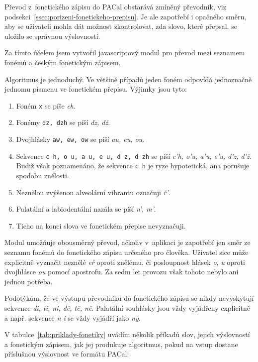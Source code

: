 Převod z~fonetického zápisu do PACal obstarává zmíněný převodník, viz
podsekci~\ref{ssec:porizeni-fonetickeho-prepisu}. Je ale zapotřebí i opačného
směru, aby se uživateli mohla dát možnost zkontrolovat, zda slovo, které
přepsal, se uložilo se správnou výslovností.

Za tímto účelem jsem vytvořil javascriptový modul pro převod mezi seznamem
fonémů a českým fonetickým zápisem.

Algoritmus je jednoduchý. Ve většině případů jeden foném odpovídá jednoznačně
jednomu písmenu ve fonetickém přepisu. Výjimky jsou tyto:
\begin{enumerate}
\item{Foném \texttt{x} se píše {\em ch}.}
\item{Fonémy \texttt{dz, dzh} se píší {\em dz, dž}.}
\item{Dvojhlásky \texttt{aw, ew, ow} se píší {\em au, eu, ou}.}
\item{
    Sekvence \texttt{c h, o u, a u, e u, d z, d zh} se píší
    {\em c'h, o'u, a'u, e'u, d'z, d'ž}.
    Budiž však poznamenáno, že sekvence \texttt{c h} je ryze hypotetická, ana
    porušuje spodobu znělosti.
}
\item{
    Neznělou zvýšenou alveolární vibrantu označuji {\em ř'}.
}
\item{
    Palatální a labiodentální nazála se píší {\em n', m'}.
}
\item{Ticho na konci slova ve fonetickém přepise nevyznačuji.}
\end{enumerate}

Modul umožňuje obousměrný převod, ačkoliv v~aplikaci je zapotřebí jen směr ze seznamu fonémů do
fonetického zápisu určeného pro člověka. Uživatel sice může explicitně vyznačit
neznělé {\em eř} oproti znělému, či posloupnost hlásek {\em o}, {\em u} oproti
dvojhlásce {\em ou} pomocí apostrofu. Za sedm let provozu však tohoto nebylo ani
jednou potřeba.

Podotýkám, že ve výstupu převodníku do fonetického zápisu se nikdy nevyskytují
sekvence {\em di, ti, ni, dě, tě, ně}. Palatální souhlásky jsou vždy vyjádřeny
explicitně a např. sekvence {\em n i} se vždy vyjádří jako {\em ny}.

V tabulce~\ref{tab:priklady-fonetiky} uvádím několik příkadů slov, jejich výslovností a fonetickým zápisem, jak jej
produkuje algoritmus, pokud na vstup dostane příslušnou výslovnost ve formátu
PACal:

